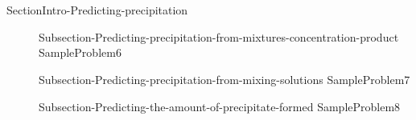 \documentclass[main.tex]{subfiles}
\newcommand\chapterlabel{Ch-solubility}\setcounter{figurenewcounter}{0}\setcounter{tablenewcounter}{0}\setcounter{formulanewcounter}{0}\chapterpicture{../{\chapterlabel}/figure1}\chapterpicturelabel{imaggeo.egu.eu/view/195/}
\begin{document}
\section{\color{blue!30!black}{Predicting precipitation from mixtures and solutions}} {SectionIntro-Predicting-precipitation}
\sloppy\begin{description}
\item[] {Subsection-Predicting-precipitation-from-mixtures-concentration-product}
{SampleProblem6}
\item[] {Subsection-Predicting-precipitation-from-mixing-solutions}
{SampleProblem7}
\item[] {Subsection-Predicting-the-amount-of-precipitate-formed}
{SampleProblem8}
\end{description}



\checkoddpage\ifoddpage \clearpage\thispagestyle{empty}\mbox{}\clearpage \else  \fi 
\end{document}
